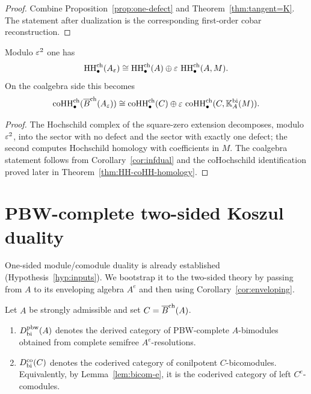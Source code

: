 \begin{proof}
Combine Proposition~\ref{prop:one-defect} and Theorem~\ref{thm:tangent=K}. The statement after
dualization is the corresponding first-order cobar reconstruction.
\end{proof}

\begin{proposition}
Modulo $\varepsilon^2$ one has
\[
\operatorname{HH}^{\mathrm{ch}}_\bullet(A_\varepsilon)
\cong
\operatorname{HH}^{\mathrm{ch}}_\bullet(A)\oplus \varepsilon\, \operatorname{HH}^{\mathrm{ch}}_\bullet(A,M).
\]
On the coalgebra side this becomes
\[
\operatorname{coHH}^{\mathrm{ch}}_\bullet(\overline{B}^{\mathrm{ch}}(A_\varepsilon))
\cong
\operatorname{coHH}^{\mathrm{ch}}_\bullet(C)\oplus \varepsilon\,
\operatorname{coHH}^{\mathrm{ch}}_\bullet(C,\mathbb{K}_A^{\mathrm{bi}}(M)).
\]
\end{proposition}

\begin{proof}
The Hochschild complex of the square-zero extension decomposes, modulo $\varepsilon^2$, into the sector with
no defect and the sector with exactly one defect; the second computes Hochschild homology with
coefficients in $M$. The coalgebra statement follows from
Corollary~\ref{cor:infdual} and the coHochschild identification proved later in
Theorem~\ref{thm:HH-coHH-homology}.
\end{proof}

\section{PBW-complete two-sided Koszul duality}

One-sided module/comodule duality is already established (Hypothesis~\ref{hyp:inputs}). We
bootstrap it to the two-sided theory by passing from $A$ to its enveloping algebra $A^e$ and
then using Corollary~\ref{cor:enveloping}.

\begin{definition}
Let $A$ be strongly admissible and set $C=\overline{B}^{\mathrm{ch}}(A)$.
\begin{enumerate}[label=(\alph*)]
\item $D^{\mathrm{pbw}}_{\mathrm{bi}}(A)$ denotes the derived category of PBW-complete $A$-bimodules obtained
from complete semifree $A^e$-resolutions.

\item $D^{\mathrm{co}}_{\mathrm{bi}}(C)$ denotes the coderived category of conilpotent $C$-bicomodules.
Equivalently, by Lemma~\ref{lem:bicom-e}, it is the coderived category of left $C^e$-comodules.
\end{enumerate}
\end{definition}

